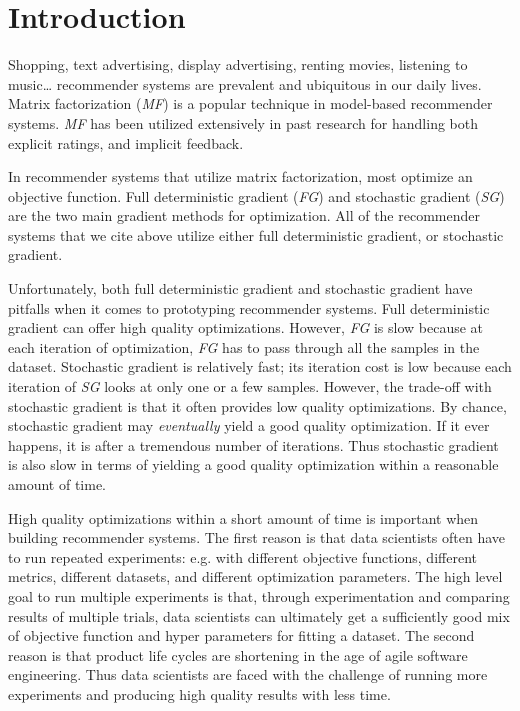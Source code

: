 \section{Introduction}
Shopping, text advertising, display advertising, renting movies, listening to music… recommender systems are prevalent and ubiquitous in our daily lives.  
Matrix factorization (\emph{MF}) is a popular technique in model-based recommender systems.  
\emph{MF} has been utilized extensively in past research for handling both explicit \cite{mmmf2005fast, mnar, gapfm} ratings, and implicit \cite{wrmf2008hu, wrmf2008pan, climf, bpr, mnar} feedback.  

In recommender systems that utilize matrix factorization, most optimize an objective function.  
Full deterministic gradient (\emph{FG}) and stochastic gradient (\emph{SG}) are the two main gradient methods for optimization.  
All of the recommender systems that we cite above utilize either full deterministic gradient, or stochastic gradient.

Unfortunately, both full deterministic gradient and stochastic gradient have pitfalls when it comes to prototyping recommender systems.  
Full deterministic gradient can offer high quality optimizations.  
However, \emph{FG} is slow because at each iteration of optimization, \emph{FG} has to pass through all the samples in the dataset.  
Stochastic gradient is relatively fast; its iteration cost is low because each iteration of \emph{SG} looks at only one or a few samples.  
However, the trade-off with stochastic gradient is that it often provides low quality optimizations.  
By chance, stochastic gradient may \emph{eventually} yield a good quality optimization. 
If it ever happens, it is after a tremendous number of iterations.  
Thus stochastic gradient is also slow in terms of yielding a good quality optimization within a reasonable amount of time.

High quality optimizations within a short amount of time is important when building recommender systems.  
The first reason is that data scientists often have to run repeated experiments: e.g. with different objective functions, different metrics, different datasets, and different optimization parameters.  
The high level goal to run multiple experiments is that, through experimentation and comparing results of multiple trials, 
data scientists can ultimately get a sufficiently good mix of objective function and hyper parameters for fitting a dataset.  
The second reason is that product life cycles are shortening in the age of agile software engineering.  
Thus data scientists are faced with the challenge of running more experiments and producing high quality results with less time.  

